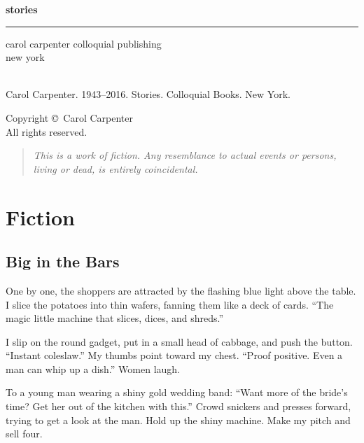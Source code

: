 \documentclass[twoside,10pt]{book}
\author{}
\date{}
\begin{document}
\frontmatter
\pagestyle{empty}
\pagecolor{darkvintageorange}
\color{white} %
\begin{center}
  \vspace*{48pt}
  \hfill {\fontsize{86}{52}\sffamily\bfseries stories}
  \\[12pt]
  \hrule height 1pt
  \hfill {\fontsize{24}{52}\sffamily carol carpenter}
  \vfill
  \hfill {\sffamily colloquial publishing}
  \\
  \hfill {\sffamily new york}
\end{center}
\color{black} %


\clearpage
\pagecolor{white}
\mbox{}
\\[36pt]
Carol Carpenter. 1943--2016.  Stories.  Colloquial Books.  New
York. 
\\[12pt]
\begin{center}
Copyright \copyright\, Carol Carpenter
\\[4pt]
All rights reserved.
\end{center}
\vfill
\begin{quote}
\emph{This is a work of fiction. Any resemblance to actual events or
persons, living or dead, is entirely coincidental.}
\end{quote}
\vfill
\vfill
\null

\cleardoublepage
\pagestyle{fancy}
\tableofcontents


\mainmatter
\cleardoublepage
\part{Fiction}
\thispagestyle{empty}

\cleardoublepage
\chapter{Big in the Bars}

One by one, the shoppers are attracted by the flashing blue light above
the table. I slice the potatoes into thin wafers, fanning them like a
deck of cards. ``The magic little machine that slices, dices, and
shreds.''

I slip on the round gadget, put in a small head of cabbage, and push the
button. ``Instant coleslaw.'' My thumbs point toward my chest. ``Proof
positive. Even a man can whip up a dish.'' Women laugh.

To a young man wearing a shiny gold wedding band: ``Want more of the
bride's time? Get her out of the kitchen with this.'' Crowd snickers and
presses forward, trying to get a look at the man. Hold up the shiny
machine. Make my pitch and sell four.
\end{document}
